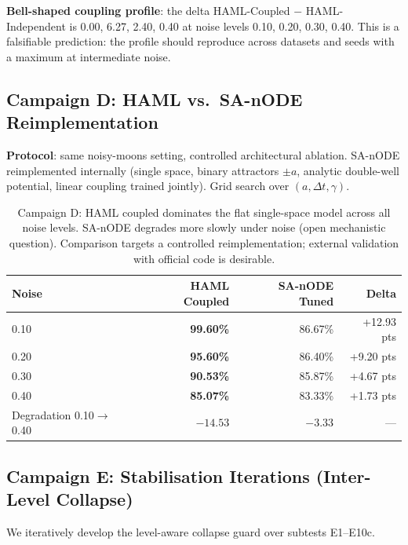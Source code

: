 \documentclass[11pt,a4paper]{article}
\begin{document}
\textbf{Bell-shaped coupling profile}: the delta HAML-Coupled $-$ HAML-Independent is 0.00, 6.27,
2.40, 0.40 at noise levels 0.10, 0.20, 0.30, 0.40.  This is a falsifiable prediction: the
profile should reproduce across datasets and seeds with a maximum at intermediate noise.

\subsection{Campaign D: HAML vs.\ SA-nODE Reimplementation}

\textbf{Protocol}: same noisy-moons setting, controlled architectural ablation.  SA-nODE
reimplemented internally (single space, binary attractors $\pm a$, analytic double-well
potential, linear coupling trained jointly).  Grid search over $(a, \Delta t, \gamma)$.

\begin{table}[h]
\centering
\begin{tabular}{lrrr}
\toprule
\textbf{Noise} & \textbf{HAML Coupled} & \textbf{SA-nODE Tuned} & \textbf{Delta} \\
\midrule
0.10 & \textbf{99.60\%} & 86.67\% & +12.93 pts \\
0.20 & \textbf{95.60\%} & 86.40\% & +9.20 pts \\
0.30 & \textbf{90.53\%} & 85.87\% & +4.67 pts \\
0.40 & \textbf{85.07\%} & 83.33\% & +1.73 pts \\
\midrule
Degradation 0.10$\to$0.40 & $-14.53$ & $-3.33$ & --- \\
\bottomrule
\end{tabular}
\caption{Campaign D: HAML coupled dominates the flat single-space model across all noise levels.
SA-nODE degrades more slowly under noise (open mechanistic question). Comparison targets a
controlled reimplementation; external validation with official code is desirable.}
\label{tab:campaign_d}
\end{table}

\subsection{Campaign E: Stabilisation Iterations (Inter-Level Collapse)}

We iteratively develop the level-aware collapse guard over subtests E1--E10c.
\end{document}
